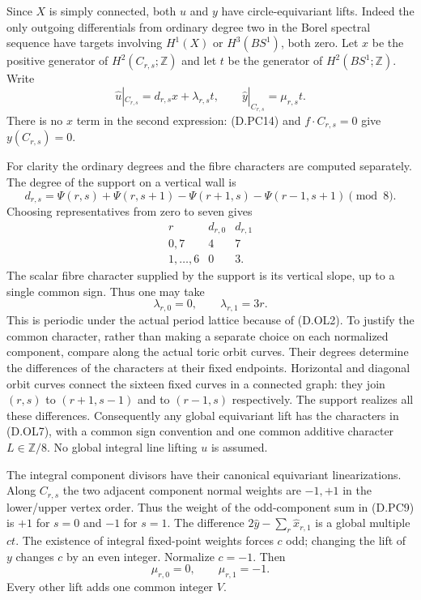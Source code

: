 Since $X$ is simply connected, both $u$ and $y$ have circle-equivariant
lifts. Indeed the only outgoing differentials from ordinary degree
two in the Borel spectral sequence have targets involving
$H^1(X)$ or $H^3(BS^1)$, both zero. Let $x$ be the positive
generator of $H^2(C_{r,s};\mathbb Z)$ and let $t$ be the generator
of $H^2(BS^1;\mathbb Z)$. Write
\[
 \widehat u|_{C_{r,s}}=d_{r,s}x+\lambda_{r,s}t,
 \qquad
 \widehat y|_{C_{r,s}}=\mu_{r,s}t.                         \tag{D.OL4}
\]
There is no $x$ term in the second expression: (D.PC14) and
$f\cdot C_{r,s}=0$ give $y(C_{r,s})=0$.

For clarity the ordinary degrees and the fibre characters are
computed separately. The degree of the support on a vertical wall is
\[
 d_{r,s}=\Psi(r,s)+\Psi(r,s+1)
              -\Psi(r+1,s)-\Psi(r-1,s+1)\pmod8 .         \tag{D.OL5}
\]
Choosing representatives from zero to seven gives
\[
\begin{array}{c|cc}
 r&d_{r,0}&d_{r,1}\\\hline
 0,7&4&7\\
 1,\ldots,6&0&3.
\end{array}                                                \tag{D.OL6}
\]
The scalar fibre character supplied by the support is its vertical
slope, up to a single common sign. Thus one may take
\[
                 \lambda_{r,0}=0,\qquad
                 \lambda_{r,1}=3r .                      \tag{D.OL7}
\]
This is periodic under the actual period lattice because of
(D.OL2). To justify the common character, rather than making a
separate choice on each normalized component, compare along the
actual toric orbit curves. Their degrees determine the differences
of the characters at their fixed endpoints. Horizontal and diagonal
orbit curves connect the sixteen fixed curves in a connected graph:
they join $(r,s)$ to $(r+1,s-1)$ and to $(r-1,s)$ respectively.
The support realizes all these differences. Consequently any global
equivariant lift has the characters in (D.OL7), with a common sign
convention and one common additive character $L\in\mathbb Z/8$.
No global integral line lifting $u$ is assumed.

The integral component divisors have their canonical equivariant
linearizations. Along $C_{r,s}$ the two adjacent component normal
weights are $-1,+1$ in the lower/upper vertex order. Thus the weight
of the odd-component sum in (D.PC9) is $+1$ for $s=0$ and $-1$
for $s=1$. The difference
$2\widehat y-\sum_r\widehat x_{r,1}$ is a global multiple $ct$.
The existence of integral fixed-point weights forces $c$ odd;
changing the lift of $y$ changes $c$ by an even integer. Normalize
$c=-1$. Then
\[
                       \mu_{r,0}=0,\qquad
                       \mu_{r,1}=-1.                     \tag{D.OL8}
\]
Every other lift adds one common integer $V$.

